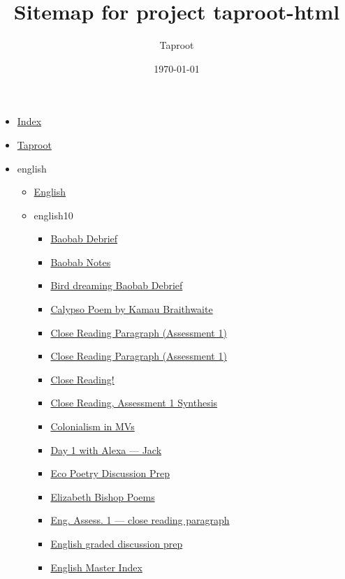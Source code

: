 \documentclass[11pt]{article}
\author{Taproot}
\date{\today}
\title{Sitemap for project taproot-html}
\begin{document}
\maketitle
\tableofcontents

\begin{itemize}
\item \href{theindex.org}{Index}
\item \href{index.org}{Taproot}
\item english
\begin{itemize}
\item \href{english/index.org}{English}
\item english10
\begin{itemize}
\item \href{english/english10/20eng201floBaobabColonialism.org}{Baobab Debrief}
\item \href{english/english10/KBBaobabNotes.org}{Baobab Notes}
\item \href{english/english10/20eng201floBaobabDebrief.org}{Bird dreaming Baobab Debrief}
\item \href{english/english10/KBe21eng201floPoetryCalypso.org}{Calypso Poem by Kamau Braithwaite}
\item \href{english/english10/KBe20eng201retA1index.org}{Close Reading Paragraph (Assessment 1)}
\item \href{english/english10/exr0n20eng201retA1Index.org}{Close Reading Paragraph (Assessment 1)}
\item \href{english/english10/KBhENG201CloseReading.org}{Close Reading!}
\item \href{english/english10/KBhENG201CloseReadingAss1.org}{Close Reading, Assessment 1 Synthesis}
\item \href{english/english10/KBhENG201ColonialismInMVs.org}{Colonialism in MVs}
\item \href{english/english10/KBhENG201AlexaD1.org}{Day 1 with Alexa --- Jack}
\item \href{english/english10/KBxEcoPoetryDiscussionPrep.org}{Eco Poetry Discussion Prep}
\item \href{english/english10/KBElizabethBishop.org}{Elizabeth Bishop Poems}
\item \href{english/english10/KBhENG201CloseReadingParagraph.org}{Eng. Assess. 1 --- close reading paragraph}
\item \href{english/english10/KBENG201GradedDiscussionPrep.org}{English graded discussion prep}
\item \href{english/english10/index.org}{English Master Index}

\end{itemize}
\end{itemize}
\end{itemize}
\end{document}
